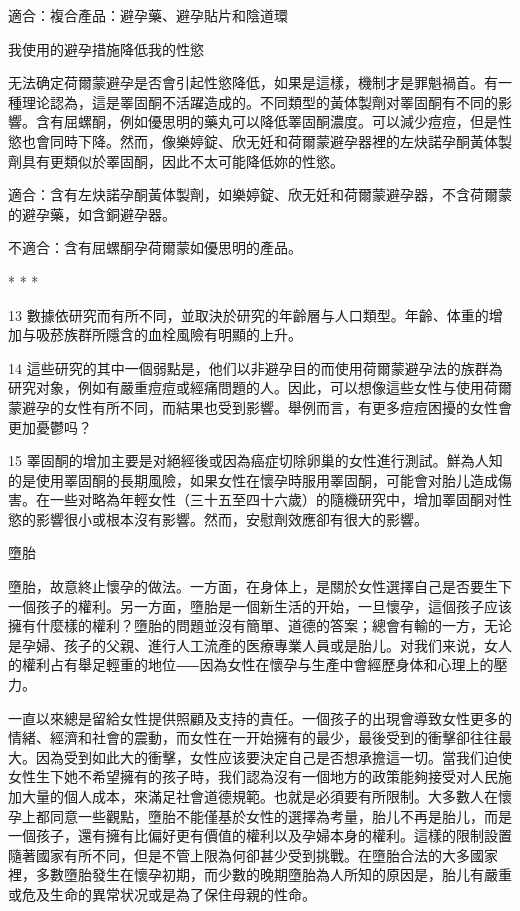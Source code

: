 \documentclass[12pt,UTF8]{ctexbook}
\begin{document}
適合：複合產品：避孕藥、避孕貼片和陰道環





我使用的避孕措施降低我的性慾


无法确定荷爾蒙避孕是否會引起性慾降低，如果是這樣，機制才是罪魁禍首。有一種理论認為，這是睪固酮不活躍造成的。不同類型的黃体製劑对睪固酮有不同的影響。含有屈螺酮，例如優思明的藥丸可以降低睪固酮濃度。可以減少痘痘，但是性慾也會同時下降。然而，像樂婷錠、欣无妊和荷爾蒙避孕器裡的左炔諾孕酮黃体製劑具有更類似於睪固酮，因此不太可能降低妳的性慾。

適合：含有左炔諾孕酮黃体製劑，如樂婷錠、欣无妊和荷爾蒙避孕器，不含荷爾蒙的避孕藥，如含銅避孕器。

不適合：含有屈螺酮孕荷爾蒙如優思明的產品。





* * *



13	數據依研究而有所不同，並取決於研究的年齡層与人口類型。年齡、体重的增加与吸菸族群所隱含的血栓風險有明顯的上升。



14	這些研究的其中一個弱點是，他们以非避孕目的而使用荷爾蒙避孕法的族群為研究对象，例如有嚴重痘痘或經痛問題的人。因此，可以想像這些女性与使用荷爾蒙避孕的女性有所不同，而結果也受到影響。舉例而言，有更多痘痘困擾的女性會更加憂鬱吗？



15	睪固酮的增加主要是对絕經後或因為癌症切除卵巢的女性進行測試。鮮為人知的是使用睪固酮的長期風險，如果女性在懷孕時服用睪固酮，可能會对胎儿造成傷害。在一些对略為年輕女性（三十五至四十六歲）的隨機研究中，增加睪固酮对性慾的影響很小或根本沒有影響。然而，安慰劑效應卻有很大的影響。





墮胎




墮胎，故意終止懷孕的做法。一方面，在身体上，是關於女性選擇自己是否要生下一個孩子的權利。另一方面，墮胎是一個新生活的开始，一旦懷孕，這個孩子应该擁有什麼樣的權利？墮胎的問題並沒有簡單、道德的答案；總會有輸的一方，无论是孕婦、孩子的父親、進行人工流產的医療專業人員或是胎儿。对我们来说，女人的權利占有舉足輕重的地位⸺因為女性在懷孕与生產中會經歷身体和心理上的壓力。

一直以來總是留給女性提供照顧及支持的責任。一個孩子的出現會導致女性更多的情緒、經濟和社會的震動，而女性在一开始擁有的最少，最後受到的衝擊卻往往最大。因為受到如此大的衝擊，女性应该要決定自己是否想承擔這一切。當我们迫使女性生下她不希望擁有的孩子時，我们認為沒有一個地方的政策能夠接受对人民施加大量的個人成本，來滿足社會道德規範。也就是必須要有所限制。大多數人在懷孕上都同意一些觀點，墮胎不能僅基於女性的選擇為考量，胎儿不再是胎儿，而是一個孩子，還有擁有比偏好更有價值的權利以及孕婦本身的權利。這樣的限制設置隨著國家有所不同，但是不管上限為何卻甚少受到挑戰。在墮胎合法的大多國家裡，多數墮胎發生在懷孕初期，而少數的晚期墮胎為人所知的原因是，胎儿有嚴重或危及生命的異常状况或是為了保住母親的性命。
\end{document}

